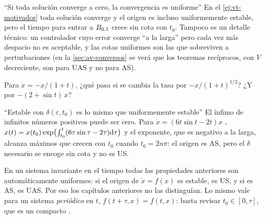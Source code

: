 \begin{trampa}[label=tr:vt-converge]{``Si toda solución converge a cero, la convergencia es uniforme''}
En el \cref{ej:vt-motivador} toda solución converge y el origen es incluso uniformemente estable, pero el tiempo para entrar a $B_{0.1}$ crece sin cota con $t_0$. Tampoco es un detalle técnico: un controlador cuyo error converge ``a la larga'' pero cada vez más despacio no es aceptable, y las cotas uniformes son las que sobreviven a perturbaciones (en la \cref{sec:av-conversos} se verá que los teoremas recíprocos, con $V$ decreciente, son para UAS y no para AS).
\end{trampa}

\begin{pausa}
Para $\dot x=-x/(1+t)$, ¿qué pasa si se cambia la tasa por $-x/(1+t)^{1/2}$? ¿Y por $-(2+\sin t)\,x$?
\end{pausa}

\begin{trampa}[label=tr:vt-estable]{``Estable con $\delta(\varepsilon,t_0)$ es lo mismo que uniformemente estable''}
El ínfimo de infinitos números positivos puede ser cero. Para $\dot x=(6t\sin t-2t)x$ \citep[\S4.5]{Kha02}, $x(t)=x(t_0)\exp\bigl(\int_{t_0}^t(6\tau\sin\tau-2\tau)\mathrm{d}\tau\bigr)$ y el exponente, que es negativo a la larga, alcanza máximos que crecen con $t_0$ cuando $t_0=2n\pi$: el origen es AS, pero el $\delta$ necesario se encoge sin cota y no es US.
\end{trampa}

En un sistema invariante en el tiempo todas las propiedades anteriores son automáticamente uniformes: si el origen de $\dot x=f(x)$ es estable, es US, y si es AS, es UAS. Por eso los capítulos anteriores no las distinguían. Lo mismo vale para un sistema \emph{periódico} en $t$, $f(t+\tau,x)=f(t,x)$: basta revisar $t_0\in[0,\tau]$, que es un compacto \citep[Teo.~38.5]{Hah67}.
